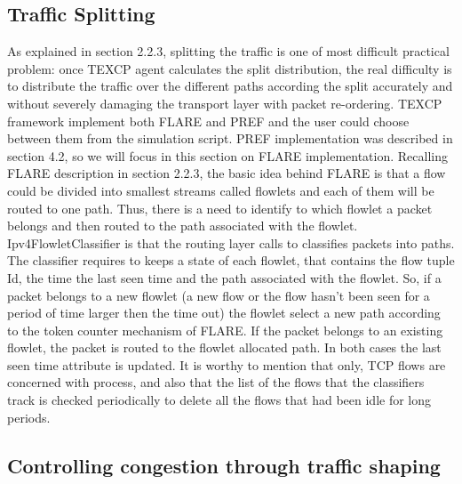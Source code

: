 \subsection{Traffic Splitting}

As explained in section 2.2.3, splitting the traffic is one of most difficult practical problem: once TEXCP agent calculates the split distribution, the real difficulty is to distribute the traffic over the different paths according the split accurately and without  severely damaging the transport layer with packet re-ordering. TEXCP framework implement both FLARE and PREF and the user could choose between them from the simulation script. PREF implementation was described in section 4.2, so we will focus in this section on FLARE implementation. Recalling FLARE description in section 2.2.3, the basic idea behind FLARE is that a flow could be divided into smallest streams called flowlets and each of them will be routed to one path. Thus, there is a need to identify to which flowlet a packet belongs and then routed to the path associated with the flowlet. Ipv4FlowletClassifier is that the routing layer calls to classifies packets into paths. The classifier requires to keeps a state of each flowlet, that contains the flow tuple Id, the time the last seen time and the path associated with the flowlet. So, if a packet belongs to a new flowlet (a new flow or the flow hasn't been seen for a period of time larger then the time out) the flowlet select a new path according to the token counter mechanism of FLARE. If the packet belongs to an existing flowlet, the packet is routed to the flowlet allocated path. In both cases the last seen time attribute is updated. It is worthy to mention that only, TCP flows are concerned with process, and also that the list of the flows that the classifiers track is checked periodically to delete all the flows that had been idle for long periods. 

\subsection{Controlling congestion through traffic shaping}

